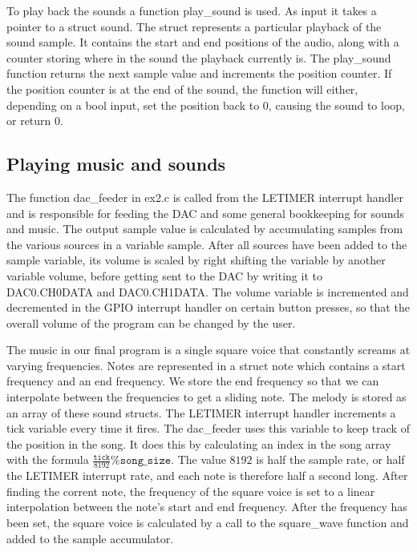 To play back the sounds a function play\_sound is used. As input it takes a
pointer to a struct sound. The struct represents a particular playback of the
sound sample. It contains the start and end positions of the audio, along with a
counter storing where in the sound the playback currently is. The play\_sound
function returns the next sample value and increments the position counter. If
the position counter is at the end of the sound, the function will either,
depending on a bool input, set the position back to 0, causing the sound to
loop, or return 0.

\subsection{Playing music and sounds}

The function dac\_feeder in ex2.c is called from the LETIMER interrupt handler
and is responsible for feeding the DAC and some general bookkeeping for sounds
and music. The output sample value is calculated by accumulating samples from
the various sources in a variable sample. After all sources have been added to
the sample variable, its volume is scaled by right shifting the variable by
another variable volume, before getting sent to the DAC by writing it to
DAC0.CH0DATA and DAC0.CH1DATA. The volume variable is incremented and
decremented in the GPIO interrupt handler on certain button presses, so that the
overall volume of the program can be changed by the user.

The music in our final program is a single square voice that constantly screams
at varying frequencies. Notes are represented in a struct note which contains a
start frequency and an end frequency. We store the end frequency so that we can
interpolate between the frequencies to get a sliding note. The melody is stored
as an array of these sound structs. The LETIMER interrupt handler increments a
tick variable every time it fires. The dac\_feeder uses this variable to keep
track of the position in the song. It does this by calculating an index in the
song array with the formula \( \frac{\texttt{tick}}{8192} \% \texttt{song\_size}
\). The value \( 8192 \) is half the sample rate, or half the LETIMER interrupt
rate, and each note is therefore half a second long. After finding the corrent
note, the frequency of the square voice is set to a linear interpolation between
the note's start and end frequency. After the frequency has been set, the square
voice is calculated by a call to the square\_wave function and added to the
sample accumulator.

